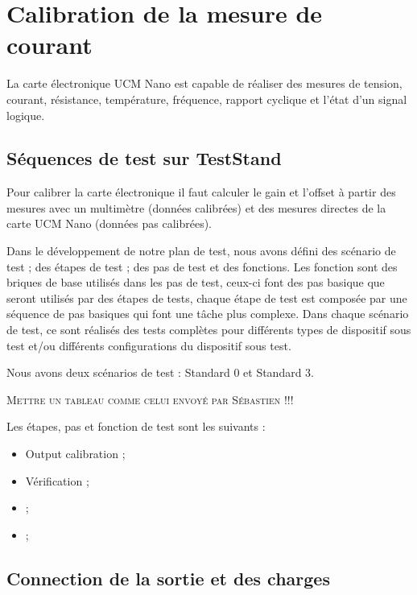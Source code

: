 \chapter{Calibration de la mesure de courant}

La carte électronique UCM Nano est capable de réaliser des mesures de tension, courant, résistance, température, fréquence, rapport cyclique et l'état d'un signal logique. 

\section{Séquences de test sur TestStand}

Pour calibrer la carte électronique il faut calculer le gain et l'offset à partir des mesures avec un multimètre (données calibrées) et des mesures directes de la carte UCM Nano (données pas calibrées).

Dans le développement de notre plan de test, nous avons défini des scénario de test ; des étapes de test ; des pas de test et des fonctions. Les fonction sont des briques de base utilisés dans les pas de test, ceux-ci font des pas basique que seront utilisés par des étapes de tests, chaque étape de test est composée par une séquence de pas basiques qui font une tâche plus complexe. Dans chaque scénario de test, ce sont réalisés des tests complètes pour différents types de dispositif sous test et/ou différents configurations du dispositif sous test.

Nous avons deux scénarios de test : Standard 0 et Standard 3. 

\textsc{Mettre un tableau comme celui envoyé par Sébastien !!!}

Les étapes, pas et fonction de test sont les suivants : 

\begin{itemize}
\item Output calibration ;
\item Vérification ;
\end{itemize}

\begin{itemize}
\item  ;
\item  ;
\end{itemize}


\section{Connection de la sortie et des charges}

